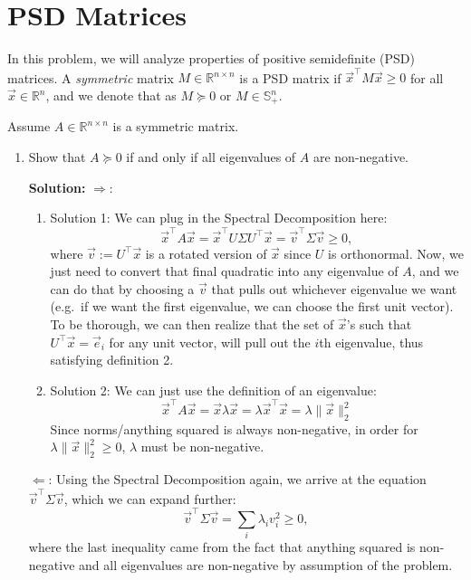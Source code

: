 \documentclass[10pt]{article}
\theoremstyle{definition}
\theoremstyle{plain}
\newcommand{\RR}{\mathbb{R}}
\begin{document}
\section{PSD Matrices}

In this problem, we will analyze properties of positive semidefinite (PSD) matrices. A \emph{symmetric} matrix $M \in \RR^{n \times n}$ is a PSD matrix if $\vec{x}^\top M \vec{x} \ge 0$ for all $\vec{x} \in \RR^n$, and we denote that as $M \succeq 0$ or $M \in \mathbb{S}^n_+$.

Assume $A \in \RR^{n \times n}$ is a symmetric matrix.

\begin{enumerate}[label=(\alph*)]
    \item Show that $A \succeq 0$ if and only if all eigenvalues of $A$ are non-negative.

    \textbf{Solution:} $\Longrightarrow$:
    \begin{enumerate}[label=\roman*.]
        \item Solution 1: We can plug in the Spectral Decomposition here:
        \begin{equation}
            \vec{x}^\top A \vec{x} = \vec{x}^\top U \Sigma U^\top \vec{x} = \vec{v}^\top \Sigma \vec{v} \ge 0,
        \end{equation}
        where $\vec{v} := U^\top \vec{x}$ is a rotated version of $\vec{x}$ since $U$ is orthonormal. Now, we just need to convert that final quadratic into any eigenvalue of $A$, and we can do that by choosing a $\vec{v}$ that pulls out whichever eigenvalue we want (e.g.\ if we want the first eigenvalue, we can choose the first unit vector). To be thorough, we can then realize that the set of $\vec{x}$'s such that $U^\top \vec{x} = \vec{e}_i$ for any unit vector, will pull out the $i$th eigenvalue, thus satisfying definition 2.

        \item Solution 2: We can just use the definition of an eigenvalue:
        \begin{equation}
            \vec{x}^\top A \vec{x} = \vec{x} \lambda \vec{x} = \lambda \vec{x}^\top \vec{x} = \lambda \|\vec{x}\|_2^2
        \end{equation}
        Since norms/anything squared is always non-negative, in order for $\lambda \|\vec{x}\|_2^2 \ge 0$, $\lambda$ must be non-negative.
    \end{enumerate}

    $\Longleftarrow$: Using the Spectral Decomposition again, we arrive at the equation $\vec{v}^\top \Sigma \vec{v}$, which we can expand further:
    \begin{equation}
        \vec{v}^\top \Sigma \vec{v} = \sum_i \lambda_i v_i^2 \ge 0,
    \end{equation}
    where the last inequality came from the fact that anything squared is non-negative and all eigenvalues are non-negative by assumption of the problem.


\end{enumerate}
\end{document}
